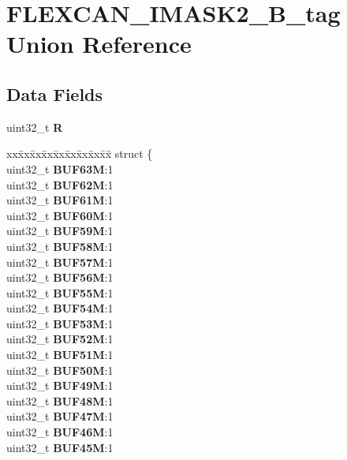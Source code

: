 \hypertarget{unionFLEXCAN__IMASK2__32B__tag}{}\section{F\+L\+E\+X\+C\+A\+N\+\_\+\+I\+M\+A\+S\+K2\+\_\+B\+\_\+tag Union Reference}
\label{unionFLEXCAN__IMASK2__32B__tag}
\subsection*{Data Fields}
\begin{DoxyCompactItemize}
\item 
\mbox{\label{unionFLEXCAN__IMASK2__32B__tag_a95ab5f999e52f942f99f9d4366def53b}} 
uint32\+\_\+t {\bfseries R}
\item 
\mbox{\label{unionFLEXCAN__IMASK2__32B__tag_a6276f6fd7eaf8d64c01d3081600e7116}} 
\begin{tabbing}
xx\=xx\=xx\=xx\=xx\=xx\=xx\=xx\=xx\=\kill
struct \{\\
\>uint32\_t {\bfseries BUF63M}:1\\
\>uint32\_t {\bfseries BUF62M}:1\\
\>uint32\_t {\bfseries BUF61M}:1\\
\>uint32\_t {\bfseries BUF60M}:1\\
\>uint32\_t {\bfseries BUF59M}:1\\
\>uint32\_t {\bfseries BUF58M}:1\\
\>uint32\_t {\bfseries BUF57M}:1\\
\>uint32\_t {\bfseries BUF56M}:1\\
\>uint32\_t {\bfseries BUF55M}:1\\
\>uint32\_t {\bfseries BUF54M}:1\\
\>uint32\_t {\bfseries BUF53M}:1\\
\>uint32\_t {\bfseries BUF52M}:1\\
\>uint32\_t {\bfseries BUF51M}:1\\
\>uint32\_t {\bfseries BUF50M}:1\\
\>uint32\_t {\bfseries BUF49M}:1\\
\>uint32\_t {\bfseries BUF48M}:1\\
\>uint32\_t {\bfseries BUF47M}:1\\
\>uint32\_t {\bfseries BUF46M}:1\\
\>uint32\_t {\bfseries BUF45M}:1\\

\end{tabbing}
\end{DoxyCompactItemize}
